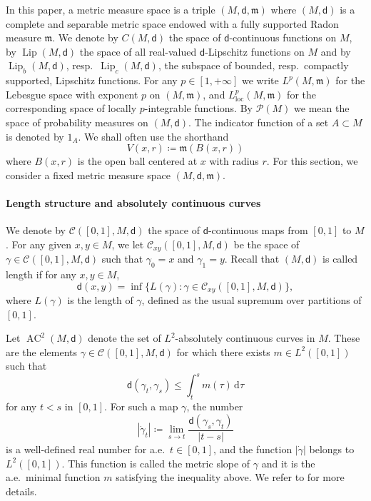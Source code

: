 \documentclass[10pt]{article}
\newcommand{\cC}{\mathcal{C}}
\newcommand{\m}{\mathfrak{m}}
\renewcommand{\d}{\,\mathrm{d}}
\newcommand{\One}{1}
\newcommand{\dist}{\mathsf{d}}
\newcommand{\df}{\coloneqq}
\DeclareMathOperator{\Lip}{Lip}
\DeclareMathOperator{\AC}{AC}
\theoremstyle{plain}
\theoremstyle{definition}
\newcommand{\contpath}{\cC([0,1],M,\dist)}
\newcommand{\contpathxy}{\cC_{xy}([0,1],M,\dist)}
\newcommand{\accurves}{\AC^2(M,\dist)}
\begin{document}
In this paper, a metric measure space is a triple $(M,\dist,\m)$ where $(M,\dist)$ is a complete and separable metric space endowed with a fully supported Radon measure $\m$. We denote by $C(M,\dist)$ the space of $\dist$-continuous functions on $M$, by $\Lip(M,\dist)$ the space of all real-valued $\dist$-Lipschitz functions on $M$ and by
$\Lip_b(M,\dist)$,  resp.~$\Lip_c(M,\dist)$, the subspace of bounded, resp.~compactly supported, Lipschitz functions. For any $p \in [1,+\infty]$ we write $L^p(M,\m)$ for the Lebesgue space with exponent $p$ on $(M,\m)$, and $L^p_{\text{loc}}(M,\m)$ for the corresponding space of locally $p$-integrable functions. By $\mathcal{P}(M)$ we mean the space of probability measures on $(M,\dist)$. The indicator function of a set $A \subset M$ is denoted by $\One_A$. We shall often use the shorthand
\[
V(x,r) \df \m(B(x,r))
\]
where $B(x,r)$ is the open ball centered at $x$ with radius $r$. For this section, we consider a fixed metric measure space $(M,\dist,\m)$.\\


\paragraph{Length structure and absolutely continuous curves} We denote by $\contpath$ the space of $\dist$-continuous maps from $[0,1]$ to $M$. For any given $x,y \in M$, we let $\contpathxy$ be the space of  $\gamma \in \contpath$ such that $\gamma_0=x$ and $\gamma_1=y$. Recall that $(M,\dist)$ is called length if for any $x,y \in M$,
\[
\dist(x,y) = \inf \{ L(\gamma) : \gamma  \in \contpathxy \},
\]
where $L(\gamma)$ is the length of $\gamma$, defined as the usual supremum over partitions of $[0,1]$.


Let $\accurves$ denote the set of $L^2$-absolutely continuous curves in $M$. These are the elements $\gamma \in \contpath$ for which there exists $m \in L^2([0,1])$ such that
\begin{equation*}  
\dist(\gamma_t,\gamma_s) \le \int_t^s m(\tau) \d \tau
\end{equation*}
for any $t<s$ in $[0,1]$.
For such a map $\gamma$, the number
\[
|\dot{\gamma}_t| \df \lim_{s \to t} \frac{\dist(\gamma_s,\gamma_t)}{|t-s|}
\]
is a well-defined real number for a.e.~$t \in [0,1]$, and the function $|\dot{\gamma}|$  belongs to $L^2([0,1])$. This function is called the metric slope of $\gamma$ and it is the a.e.~minimal function $m$ satisfying the inequality above. We refer to \cite[Theorem 1.1.2]{AGS-book} for more details.
\end{document}
